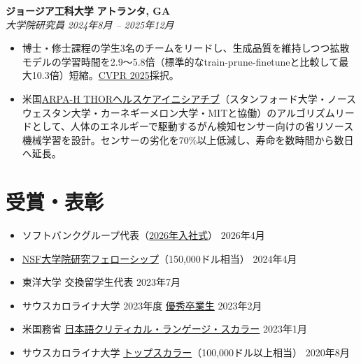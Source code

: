 \documentclass[10pt,a4paper]{article}
\newcommand{\cvlink}[2]{\href{#1}{#2}}
\newcommand{\entry}[4]{%
  \noindent\textbf{#1} \hfill \textbf{#2}\\
  \textit{#3} \hfill \textit{#4}%
}
\begin{document}
\smallskip
\entry{ジョージア工科大学}{アトランタ, GA}{大学院研究員}{2024年8月 -- 2025年12月}
\begin{itemize}[leftmargin=*, nosep, itemsep=2pt, topsep=2pt]
  \item 博士・修士課程の学生3名のチームをリードし、生成品質を維持しつつ拡散モデルの学習時間を2.9〜5.8倍（標準的なtrain-prune-finetuneと比較して最大10.3倍）短縮。\cvlink{https://openaccess.thecvf.com/content/CVPR2025/html/Whalen_Early-Bird_Diffusion_Investigating_and_Leveraging_Timestep-Aware_Early-Bird_Tickets_in_Diffusion_CVPR_2025_paper.html}{CVPR 2025}採択。
  \item 米国\cvlink{https://responsible.computing.gatech.edu/featured-project-thor/}{ARPA-H THORヘルスケアイニシアチブ}（スタンフォード大学・ノースウェスタン大学・カーネギーメロン大学・MITと協働）のアルゴリズムリードとして、人体のエネルギーで駆動するがん検知センサー向けの省リソース機械学習を設計。センサーの劣化を70\%以上低減し、寿命を数時間から数日へ延長。
\end{itemize}

\section{受賞・表彰}
\begin{itemize}[leftmargin=*, nosep, itemsep=3pt]
  \item ソフトバンクグループ代表（\cvlink{https://www.softbank.jp/sbnews/entry/20260403_01}{2026年入社式}） \hfill 2026年4月
  \item \cvlink{https://cse.sc.edu/news/lex-whalen-wins-nsf-graduate-research-fellowship}{NSF大学院研究フェローシップ}（150,000ドル相当） \hfill 2024年4月
  \item 東洋大学 交換留学生代表 \hfill 2023年7月
  \item サウスカロライナ大学 2023年度 \cvlink{https://web.cse.sc.edu/news/outstanding-senior-award-2023}{優秀卒業生} \hfill 2023年2月
  \item 米国務省 \cvlink{https://sc.edu/about/offices_and_divisions/fellowships_and_scholar_programs/news/national_fellowships_news/2023/cls_spring23.php}{日本語クリティカル・ランゲージ・スカラー} \hfill 2023年1月
  \item サウスカロライナ大学 \cvlink{https://sc.edu/about/offices_and_divisions/fellowships_and_scholar_programs/national_fellowships/usc_award_winners/recipient.php?wid=714}{トップスカラー}（100,000ドル以上相当） \hfill 2020年8月
\end{itemize}
\end{document}
